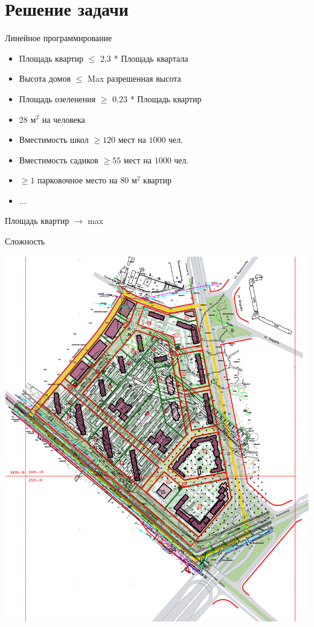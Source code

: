 \documentclass[14pt, fleqn, xcolor={dvipsnames, table}]{beamer}
\begin{document}
    \section{Решение задачи}         
        
        \begin{frame}{Линейное программирование}
            \begin{itemize}
                \item Площадь квартир $\le$ 2.3 * Площадь квартала
                \item Высота домов $\le$ Max разрешенная высота
                \item Площадь озеленения $\ge$ 0.23 * Площадь квартир
                \item 28 м$^2$ на человека
                \item Вместимость школ $\ge 120$ мест на $1000$ чел.
                \item Вместимость садиков $\ge 55$ мест на $1000$ чел.
                \item $\ge 1$ парковочное место на 80 м$^2$ квартир
                \item ...
            \end{itemize}
            Площадь квартир $\longrightarrow$ max            
                          
        \end{frame}
        
        \begin{frame}{Сложность}
            \begin{center}
                \includegraphics[scale=0.075]{nerd.jpg} 
            \end{center}  
        \end{frame}
        
\end{document}
